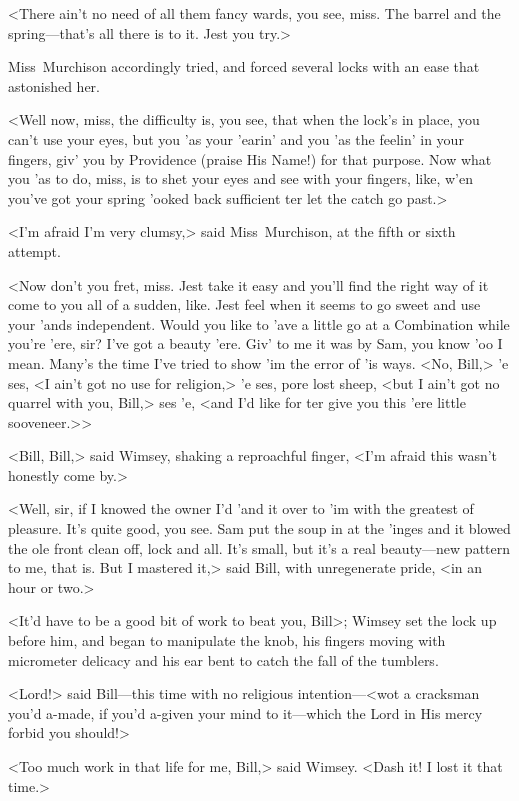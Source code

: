 <There ain't no need of all them fancy wards, you see, miss. The barrel and the spring—that's all there is to it. Jest you try.>

Miss~Murchison accordingly tried, and forced several locks with an ease that astonished her.

<Well now, miss, the difficulty is, you see, that when the lock's in place, you can't use your eyes, but you 'as your 'earin' and you 'as the feelin' in your fingers, giv' you by Providence (praise His Name!) for that purpose. Now what you 'as to do, miss, is to shet your eyes and see with your fingers, like, w'en you've got your spring 'ooked back sufficient ter let the catch go past.>

<I'm afraid I'm very clumsy,> said Miss~Murchison, at the fifth or sixth attempt.

<Now don't you fret, miss. Jest take it easy and you'll find the right way of it come to you all of a sudden, like. Jest feel when it seems to go sweet and use your 'ands independent. Would you like to 'ave a little go at a Combination while you're 'ere, sir? I've got a beauty 'ere. Giv' to me it was by Sam, you know 'oo I mean. Many's the time I've tried to show 'im the error of 'is ways. <No, Bill,> 'e ses, <I ain't got no use for religion,> 'e ses, pore lost sheep, <but I ain't got no quarrel with you, Bill,> ses 'e, <and I'd like for ter give you this 'ere little sooveneer.>>

<Bill, Bill,> said Wimsey, shaking a reproachful finger, <I'm afraid this wasn't honestly come by.>

<Well, sir, if I knowed the owner I'd 'and it over to 'im with the greatest of pleasure. It's quite good, you see. Sam put the soup in at the 'inges and it blowed the ole front clean off, lock and all. It's small, but it's a real beauty—new pattern to me, that is. But I mastered it,> said Bill, with unregenerate pride, <in an hour or two.>

<It'd have to be a good bit of work to beat you, Bill>; Wimsey set the lock up before him, and began to manipulate the knob, his fingers moving with micrometer delicacy and his ear bent to catch the fall of the tumblers.

<Lord!> said Bill—this time with no religious intention—<wot a cracksman you'd a-made, if you'd a-given your mind to it—which the Lord in His mercy forbid you should!>

<Too much work in that life for me, Bill,> said Wimsey. <Dash it! I lost it that time.>

